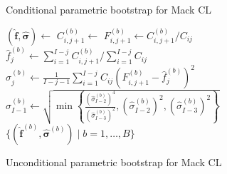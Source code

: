 \documentclass[a4paper]{book}
\begin{document}
\begin{figure}[p]
  \begin{algorithm}[H]
    \caption{Conditional parametric bootstrap for Mack CL} 
    \label{alg:cond-param-mack}
    \begin{algorithmic} 
      \vspace{3pt}
      \State $(\bm{\widehat{f}}, \bm{\widehat{\sigma}}) \gets$  
      \vspace{3pt}
        \vspace{3pt}
            \vspace{3pt}
            \State $C^{(b)}_{i, j + 1} \gets$ 
            \vspace{3pt}
            \State $\displaystyle F^{(b)}_{i, j + 1} \gets C^{(b)}_{i, j + 1} / C_{ij}$
            \vspace{3pt}
          \EndFor
          \vspace{3pt}
          \State $\widehat{f}^{(b)}_j \gets \sum_{i = 1}^{I - j} C^{(b)}_{i, j + 1} / \sum_{i = 1}^{I - j} C_{ij}$
          \vspace{3pt}
            \vspace{3pt}
            \State $\displaystyle \widehat{\sigma}^{(b)}_j \gets \frac{1}{I - j - 1}\sum_{i = 1}^{I - j} C_{ij} \left( F^{(b)}_{i, j + 1} - \widehat{f}^{(b)}_j \right)^2$
            \vspace{3pt}
          \Else
            \vspace{3pt}
            \State $\widehat{\sigma}^{(b)}_{I - 1} \gets \sqrt{\min{ \left \{ \displaystyle \frac{(\widehat{\sigma}^{(b)}_{I - 2})^4}{(\widehat{\sigma}^{(b)}_{I - 3})^2}, (\widehat{\sigma}^{(b)}_{I - 2})^2, (\widehat{\sigma}^{(b)}_{I - 3})^2 \right \} }}$
            \vspace{3pt}
            \EndIf
          \EndFor
      \EndFor
      \State \Return $\{ (\widehat{\bm{f}}^{(b)}, \widehat{\bm{\sigma}}^{(b)}) \mid b = 1, \dots, B \}$
    \end{algorithmic}
  \end{algorithm}
  \begin{algorithm}[H]
    \caption{Unconditional parametric bootstrap for Mack CL} 
    \label{alg:uncond-param-mack}
    \begin{algorithmic} 

\end{algorithmic}
\end{algorithm}
\end{figure}
\end{document}
